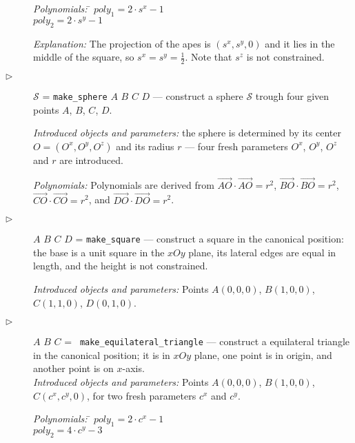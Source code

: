 \documentclass[final,1p,times,authoryear]{elsarticle}
\begin{document}
\begin{description}
\begin{tabbing}
{\em Polynomials:} \= $poly_1 = 2\cdot s^x - 1$ \\
                   \> $poly_2 = 2\cdot s^y - 1$
\end{tabbing}

{\em Explanation:} The projection of the apes is $(s^x, s^y, 0)$ and
it lies in the middle of the square, so $s^x = s^y =
\frac{1}{2}$. Note that $s^z$ is not constrained.

\item[$\triangleright$] $\mathcal{S}$ = {\tt make\_sphere} $A$ $B$ $C$
  $D$ --- construct a sphere $\mathcal{S}$ trough four given points
  $A$, $B$, $C$, $D$.
  
 {\em Introduced objects and parameters:} the sphere is determined by
 its center $O = (O^x, O^y, O^z)$ and its radius $r$ --- four fresh
 parameters $O^x$, $O^y$, $O^z$ and $r$ are introduced.

{\em Polynomials:} Polynomials are derived from
$\overrightarrow{AO}\cdot\overrightarrow{AO} = r^2$,
$\overrightarrow{BO}\cdot\overrightarrow{BO} = r^2$,
$\overrightarrow{CO}\cdot\overrightarrow{CO} = r^2$, and
$\overrightarrow{DO}\cdot\overrightarrow{DO} = r^2$.

\item[$\triangleright$] $A$ $B$ $C$ $D$ = {\tt make\_square} ---
  construct a square in the canonical position: the base is a unit
  square in the $xOy$ plane, its lateral edges are equal in length,
  and the height is not constrained.

  {\em Introduced objects and parameters:} Points $A(0, 0, 0)$,
  $B(1, 0, 0)$, $C(1, 1, 0)$, $D(0, 1, 0)$.

\item[$\triangleright$] $A$ $B$ $C$ = {\tt
    make\_equilateral\_triangle} --- construct a equilateral triangle
  in the canonical position; it is in $xOy$ plane, one point is in
  origin, and another point is on
  $x$-axis. \\
  {\em Introduced objects and parameters:} Points $A(0, 0, 0)$,
  $B(1, 0, 0)$, $C(c^x, c^y, 0)$, for two fresh parameters $c^x$ and
  $c^y$.

\begin{tabbing}
{\em Polynomials:} \= $poly_1 = 2\cdot c^x - 1$ \\
                   \> $poly_2 = 4\cdot c^y - 3$
\end{tabbing}



\end{description}
\end{document}

